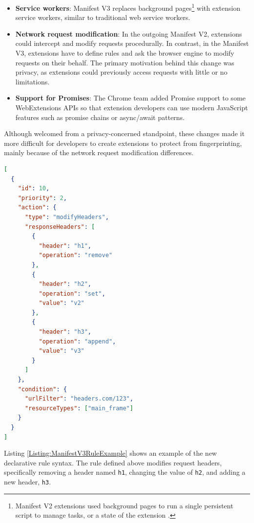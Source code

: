 \begin{itemize}
	\item \textbf{Service workers}: Manifest V3 replaces background pages\footnote{Manifest V2 extensions used background pages to run a single persistent script to manage tasks, or a state of the extension \cite{ChromeManifestV2}.} with extension service workers, similar to traditional web service workers.
	\item \textbf{Network request modification}: In the outgoing Manifest V2, extensions could intercept and modify requests procedurally. In contrast, in the Manifest V3, extensions have to define rules and ask the browser engine to modify requests on their behalf. The primary motivation behind this change was privacy, as extensions could previously access requests with little or no limitations.
	\item \textbf{Support for Promises}: The Chrome team added Promise support to some WebExtensions APIs so that extension developers can use modern JavaScript features such as promise chains or async/await patterns.
\end{itemize}

Although welcomed from a privacy-concerned standpoint, these changes made it more difficult for developers to create extensions to protect from fingerprinting, mainly because of the network request modification differences.

\bigbreak

\begin{lstlisting}[language={JSON},caption={An example of a declarative rule which modifies selected response headers \cite{ChromeWebExtensions}.}, label={Listing:ManifestV3RuleExample}]
[
  {
    "id": 10,
    "priority": 2,
    "action": {
      "type": "modifyHeaders",
      "responseHeaders": [
        {
          "header": "h1",
          "operation": "remove"
        },
        {
          "header": "h2",
          "operation": "set",
          "value": "v2"
        },
        {
          "header": "h3",
          "operation": "append",
          "value": "v3"
        }
      ]
    },
    "condition": {
      "urlFilter": "headers.com/123",
      "resourceTypes": ["main_frame"]
    }
  }
]
\end{lstlisting}

\medbreak

Listing \ref{Listing:ManifestV3RuleExample} shows an example of the new declarative rule syntax. The rule defined above modifies request headers, specifically removing a header named \texttt{h1}, changing the value of \texttt{h2}, and adding a new header, \texttt{h3}.


